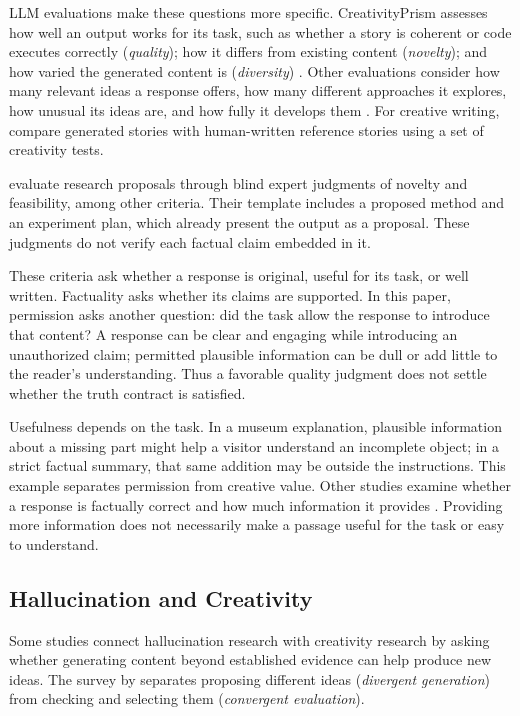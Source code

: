 \documentclass{clv2025}
\begin{document}
LLM evaluations make these questions more specific. CreativityPrism assesses
how well an output works for its task, such as whether a story is coherent
or code executes correctly (\emph{quality}); how it differs from existing
content (\emph{novelty}); and how varied the generated content is
(\emph{diversity}) \citep{hou_creativityprism_2025}.
Other evaluations consider how many relevant ideas a response offers, how
many different approaches it explores, how unusual its ideas are, and how
fully it develops them \citep{zhao_assessing_2025}. For creative writing,
\citet{li_automated_2025} compare generated stories with human-written
reference stories using a set of creativity tests.

\citet{si_ideas_2025} evaluate research proposals through blind expert
judgments of novelty and feasibility, among other criteria.
Their template includes a proposed method and an experiment plan, which
already present the output as a proposal. These judgments do not verify
each factual claim embedded in it.

These criteria ask whether a response is original, useful for its task,
or well written. Factuality asks whether its claims are supported. In this
paper, permission asks another question: did the task allow the response
to introduce that content? A response can be clear and engaging while
introducing an unauthorized claim; permitted plausible information can be dull
or add little to the reader's understanding. Thus a favorable quality
judgment does not settle whether the truth contract is satisfied.

Usefulness depends on the task. In a museum explanation, plausible information
about a missing part might help a visitor understand an incomplete object; in a strict factual
summary, that same addition may be outside the instructions. This example
separates permission from creative value. Other studies examine whether a
response is factually correct and how much information it provides
\citep{wu_balancing_2025,gong_factuality_2026}. Providing more information
does not necessarily make a passage useful for the task or easy to understand.

\subsection{Hallucination and Creativity}

Some studies connect hallucination research with creativity research by
asking whether generating content beyond established evidence can help
produce new ideas. The survey by \citet{jiang_survey_2024} separates
proposing different ideas (\emph{divergent generation}) from checking and
selecting them (\emph{convergent evaluation}).
\end{document}
